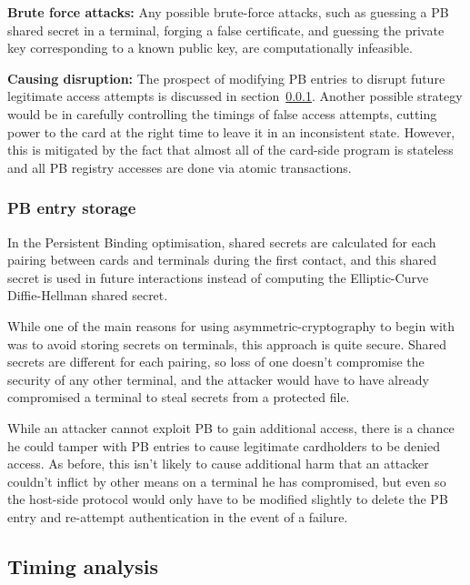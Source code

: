 \documentclass[12pt,a4paper]{article}
\begin{document}
\textbf{Brute force attacks:} Any possible brute-force attacks, such as guessing a PB shared secret in a terminal, forging a false certificate, and guessing the private key corresponding to a known public key, are computationally infeasible.

\textbf{Causing disruption:} The prospect of modifying PB entries to disrupt future legitimate access attempts is discussed in section~\ref{subsec:pb_storage}. Another possible strategy would be in carefully controlling the timings of false access attempts, cutting power to the card at the right time to leave it in an inconsistent state. However, this is mitigated by the fact that almost all of the card-side program is stateless and all PB registry accesses are done via atomic transactions.





\subsubsection{PB entry storage}
\label{subsec:pb_storage}
In the Persistent Binding optimisation, shared secrets are calculated for each pairing between cards and terminals during the first contact, and this shared secret is used in future interactions instead of computing the Elliptic-Curve Diffie-Hellman shared secret.

While one of the main reasons for using asymmetric-cryptography to begin with was to avoid storing secrets on terminals, this approach is quite secure. Shared secrets are different for each pairing, so loss of one doesn't compromise the security of any other terminal, and the attacker would have to have already compromised a terminal to steal secrets from a protected file.

While an attacker cannot exploit PB to gain additional access, there is a chance he could tamper with PB entries to cause legitimate cardholders to be denied access. As before, this isn't likely to cause additional harm that an attacker couldn't inflict by other means on a terminal he has compromised, but even so the host-side protocol would only have to be modified slightly to delete the PB entry and re-attempt authentication in the event of a failure.


\subsection{Timing analysis}
\label{sec:timing_analysis}
\end{document}
